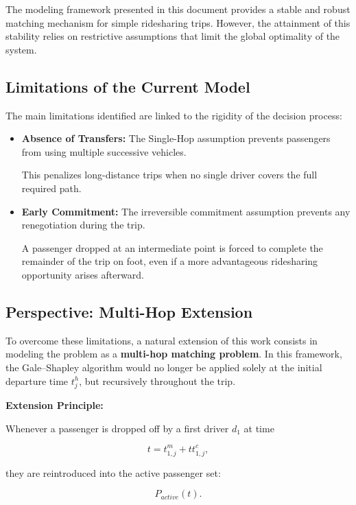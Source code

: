 \documentclass[12pt, a4paper]{article}
\begin{document}
The modeling framework presented in this document provides a stable and robust matching mechanism for simple ridesharing trips. However, the attainment of this stability relies on restrictive assumptions that limit the global optimality of the system.

\subsection{Limitations of the Current Model}

The main limitations identified are linked to the rigidity of the decision process:

\begin{itemize}

    \item \textbf{Absence of Transfers:}
    The Single-Hop assumption prevents passengers from using multiple successive vehicles.

    This penalizes long-distance trips when no single driver covers the full required path.

    \item \textbf{Early Commitment:}
    The irreversible commitment assumption prevents any renegotiation during the trip.

    A passenger dropped at an intermediate point is forced to complete the remainder of the trip on foot, even if a more advantageous ridesharing opportunity arises afterward.

\end{itemize}

\subsection{Perspective: Multi-Hop Extension}

To overcome these limitations, a natural extension of this work consists in modeling the problem as a \textbf{multi-hop matching problem}. In this framework, the Gale--Shapley algorithm would no longer be applied solely at the initial departure time $t_j^h$, but recursively throughout the trip.

\textbf{Extension Principle:}

Whenever a passenger is dropped off by a first driver $d_1$ at time

$$
t=t_{1,j}^m+tt_{1,j}^c,
$$

they are reintroduced into the active passenger set:

$$
P_{active}(t).
$$
\end{document}
